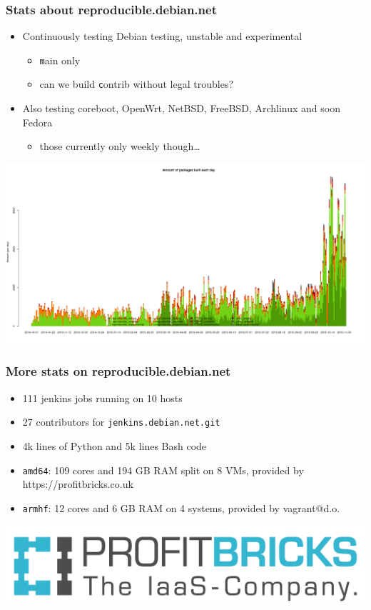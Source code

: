 \documentclass[14pt]{beamer}
\begin{document}
\begin{frame}
 \frametitle{Stats about reproducible.debian.net}

 \begin{itemize}
  \item Continuously testing Debian testing, unstable and experimental
   \begin{itemize}
    \item \small{ \texttt main only }
    \item \small{ can we build \texttt contrib without legal troubles? }
   \end{itemize}
  \item Also testing coreboot, OpenWrt, NetBSD, FreeBSD,
  Archlinux and soon Fedora
   \begin{itemize}
    \item \small{ those currently only weekly though… }
   \end{itemize}
 \end{itemize}
 \vfill
 \begin{center}
  \includegraphics[height=0.4\paperheight]{images/stats_builds_per_day_amd64.png}
 \end{center}
\end{frame}


\begin{frame}
 \frametitle{More stats on reproducible.debian.net}

 \begin{itemize}
  \item 111 jenkins jobs running on 10 hosts
  \item 27 contributors for \texttt{jenkins.debian.net.git}
  \item 4k lines of Python and 5k lines Bash code
  \item \texttt{amd64}: 109 cores and 194 GB RAM split on 8 VMs, provided by
  https://profitbricks.co.uk
  \item \texttt{armhf}: 12 cores and 6 GB RAM on 4 systems, provided by vagrant@d.o.
 \end{itemize}
 \begin{center}
  \includegraphics[height=0.15\paperheight]{images/profitbricks_logo.png}
  \vfill
 \end{center}
\end{frame}
\end{document}

